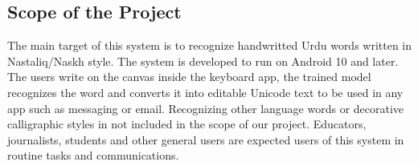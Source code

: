 \documentclass[12pt,a4paper]{report}
\begin{document}
\subsection{Scope of the Project}
The main target of this system is to recognize handwritted Urdu words written in Nastaliq/Naskh style. The system is developed to run on Android 10 and later. The users write on the canvas inside the keyboard app, the trained model recognizes the word and converts it into editable Unicode text to be used in any app such as messaging or email. Recognizing other language words or decorative calligraphic styles in not included in the scope of our project. Educators, journalists, students and other general users are expected users of this system in routine tasks and communications.
\end{document}
